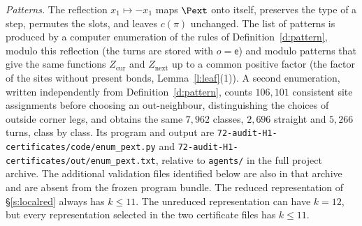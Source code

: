 \emph{Patterns.} The reflection $x_1 \mapsto -x_1$ maps $\Pext$ onto itself, preserves the type of a step, permutes the slots, and leaves $c(\pi)$ unchanged. The list of patterns is produced by a computer enumeration of the rules of Definition~\ref{d:pattern}, modulo this reflection (the turns are stored with $o = \mathsf e$) and modulo patterns that give the same functions $Z_{\mathrm{cur}}$ and $Z_{\mathrm{next}}$ up to a common positive factor (the factor of the sites without present bonds, Lemma~\ref{l:leaf}(1)). A second enumeration, written independently from Definition~\ref{d:pattern}, counts $106{,}101$ consistent site assignments before choosing an out-neighbour, distinguishing the choices of outside corner legs, and obtains the same $7{,}962$ classes, $2{,}696$ straight and $5{,}266$ turns, class by class. Its program and output are \texttt{72-audit-H1-certificates/\allowbreak code/\allowbreak enum\_\allowbreak pext.py} and \texttt{72-audit-H1-certificates/\allowbreak out/\allowbreak enum\_\allowbreak pext.txt}, relative to \texttt{agents/\allowbreak } in the full project archive. The additional validation files identified below are also in that archive and are absent from the frozen program bundle. The reduced representation of \S\ref{s:localred} always has $k \le 11$. The unreduced representation can have $k = 12$, but every representation selected in the two certificate files has $k \le 11$.

